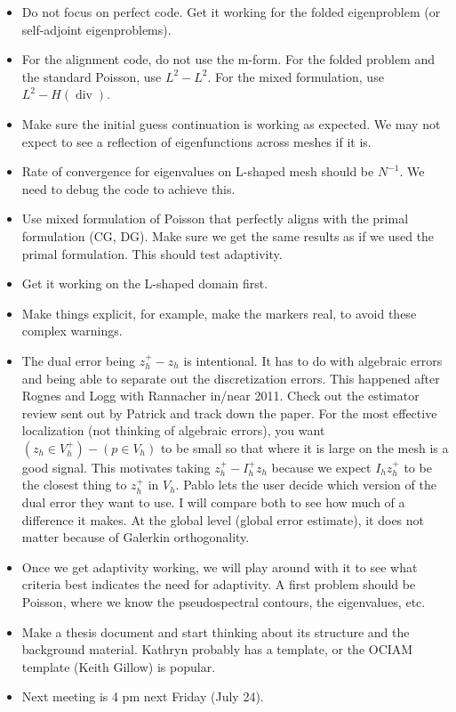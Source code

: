 \documentclass[12pt,a4paper]{article}
\begin{document}
\begin{itemize}
    \item Do not focus on perfect code. Get it working for the folded eigenproblem (or self-adjoint eigenproblems).
    \item For the alignment code, do not use the m-form. For the folded problem and the standard Poisson, use $L^2-L^2.$ For the mixed formulation, use $L^2-H(\operatorname{div}).$
    \item \checkmark Make sure the initial guess continuation is working as expected. We may not expect to see a reflection of eigenfunctions across meshes if it is. 
    \item Rate of convergence for eigenvalues on L-shaped mesh should be $ N^ {- 1}.$ We need to debug the code to achieve this.
    \item \checkmark Use mixed formulation of Poisson that perfectly aligns with the primal formulation (CG, DG). Make sure we get the same results as if we used the primal formulation. This should test adaptivity.
    \item Get it working on the L-shaped domain first.
    \item \checkmark Make things explicit, for example, make the markers real, to avoid these complex warnings.
    \item The dual error being $z_h^+ - z_h$ is intentional. It has to do with algebraic errors and being able to separate out the discretization errors. This happened after Rognes and Logg with Rannacher in/near 2011. Check out the estimator review sent out by Patrick and track down the paper. For the most effective localization (not thinking of algebraic errors), you want $(z_h \in V_h^+) - (p \in V_h)$ to be small so that where it is large on the mesh is a good signal. This motivates taking $z_h^+ - I_h^+ z_h$ because we expect $I_h z_h^+$ to be the closest thing to $z_h^+$ in $V_h.$ Pablo lets the user decide which version of the dual error they want to use. I will compare both to see how much of a difference it makes. At the global level (global error estimate), it does not matter because of Galerkin orthogonality. 
    \item Once we get adaptivity working, we will play around with it to see what criteria best indicates the need for adaptivity. A first problem should be Poisson, where we know the pseudospectral contours, the eigenvalues, etc. 
    \item Make a thesis document and start thinking about its structure and the background material. Kathryn probably has a template, or the OCIAM template (Keith Gillow) is popular.
    \item Next meeting is 4 pm next Friday (July 24).
\end{itemize}
\end{document}
